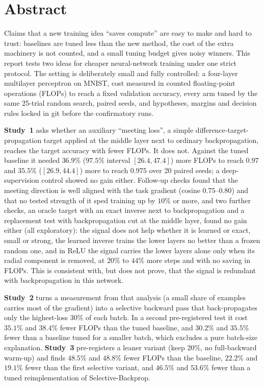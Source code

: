 \chapter*{Abstract}
Claims that a new training idea ``saves compute'' are easy to make and hard to trust: baselines are tuned less than the new method, the cost of the extra machinery is not counted, and a small tuning budget gives noisy winners. This report tests two ideas for cheaper neural-network training under one strict protocol. The setting is deliberately small and fully controlled: a four-layer multilayer perceptron on MNIST, cost measured in counted floating-point operations (FLOPs) to reach a fixed validation accuracy, every arm tuned by the same 25-trial random search, paired seeds, and hypotheses, margins and decision rules locked in git before the confirmatory runs.

\textbf{Study~1} asks whether an auxiliary ``meeting loss'', a simple difference-target-propagation target applied at the middle layer next to ordinary backpropagation, reaches the target accuracy with fewer FLOPs. It does not. Against the tuned baseline it needed $36.9\%$ ($97.5\%$ interval $[26.4,47.4]$) more FLOPs to reach $0.97$ and $35.5\%$ ($[26.9,44.4]$) more to reach $0.975$ over 20 paired seeds; a deep-supervision control showed no gain either. Follow-up checks found that the meeting direction is well aligned with the task gradient (cosine $0.75$--$0.80$) and that no tested strength of it sped training up by $10\%$ or more, and two further checks, an oracle target with an exact inverse next to backpropagation and a replacement test with backpropagation cut at the middle layer, found no gain either (all exploratory): the signal does not help whether it is learned or exact, small or strong, the learned inverse trains the lower layers no better than a frozen random one, and in ReLU the signal carries the lower layers alone only when its radial component is removed, at $20\%$ to $44\%$ more steps and with no saving in FLOPs. This is consistent with, but does not prove, that the signal is redundant with backpropagation in this network.

\textbf{Study~2} turns a measurement from that analysis (a small share of examples carries most of the gradient) into a selective backward pass that back-propagates only the highest-loss $30\%$ of each batch. In a second pre-registered test it cost $35.1\%$ and $38.4\%$ fewer FLOPs than the tuned baseline, and $30.2\%$ and $35.5\%$ fewer than a baseline tuned for a smaller batch, which excludes a pure batch-size explanation. \textbf{Study~3} pre-registers a leaner variant (keep $20\%$, no full-backward warm-up) and finds $48.5\%$ and $48.8\%$ fewer FLOPs than the baseline, $22.2\%$ and $19.1\%$ fewer than the first selective variant, and $46.5\%$ and $53.6\%$ fewer than a tuned reimplementation of Selective-Backprop.

